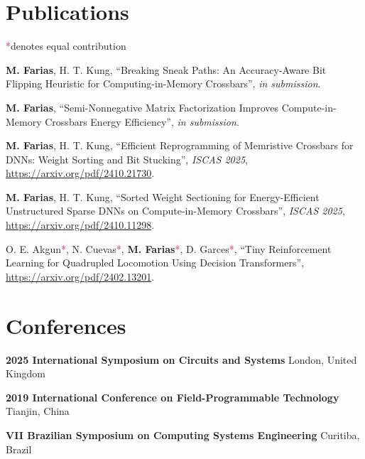 \documentclass[letterpaper,10pt]{article}
\newcommand{\co}{\textcolor{crimson}{*}}
\begin{document}
\section{Publications}
\co denotes equal contribution
\vspace*{.1cm}
\begin{etaremune}
	\renewcommand{\labelenumi}{[\theenumi]}
    \item \textbf{M. Farias}, H. T. Kung, ``Breaking Sneak Paths: An Accuracy-Aware Bit Flipping Heuristic for Computing-in-Memory Crossbars'', \textit{in submission}.
	\item \textbf{M. Farias}, ``Semi-Nonnegative Matrix Factorization Improves Compute-in-Memory Crossbars Energy Efficiency'', \textit{in submission}.
	\item \textbf{M. Farias}, H. T. Kung, ``Efficient Reprogramming of Memristive Crossbars for DNNs: Weight Sorting and Bit Stucking'', \textit{ISCAS 2025}, \href{https://arxiv.org/pdf/2410.21730}{https://arxiv.org/pdf/2410.21730}.
    \item \textbf{M. Farias}, H. T. Kung, ``Sorted Weight Sectioning for Energy-Efficient Unstructured Sparse DNNs on Compute-in-Memory Crossbars'', \textit{ISCAS 2025}, \href{https://arxiv.org/pdf/2410.11298}{https://arxiv.org/pdf/2410.11298}.
	\item O. E. Akgun\co, N. Cuevas\co, \textbf{M. Farias}\co, D. Garces\co, ``Tiny Reinforcement Learning for Quadrupled Locomotion Using Decision Transformers'', \href{https://arxiv.org/pdf/2402.13201}{https://arxiv.org/pdf/2402.13201}.
\end{etaremune}
\vspace*{-.25cm}

\section{Conferences}
\vspace*{.1cm}
\begin{etaremune}
	\item \textbf{2025 International Symposium on Circuits and Systems}
	\hfill{London, United Kingdom}
	\item \textbf{2019 International Conference on Field-Programmable Technology}
	\hfill{Tianjin, China}
	\item \textbf{VII Brazilian Symposium on Computing Systems Engineering}
	\hfill{Curitiba, Brazil}
	\end{etaremune}
\end{document}
